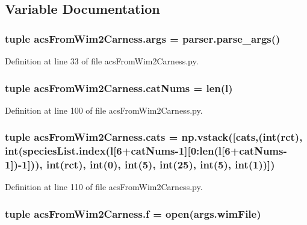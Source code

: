 \subsection{Variable Documentation}
\hypertarget{a00100_ac4c461267ee7f11bbe525de64f56cd10}{
\subsubsection[{args}]{\setlength{\rightskip}{0pt plus 5cm}tuple acs\-From\-Wim2\-Carness.\-args = parser.\-parse\-\_\-args()}}\label{a00100_ac4c461267ee7f11bbe525de64f56cd10}


Definition at line 33 of file acs\-From\-Wim2\-Carness.\-py.

\hypertarget{a00100_a0d474343423a1a87a760dd91411f96b4}{
\subsubsection[{cat\-Nums}]{\setlength{\rightskip}{0pt plus 5cm}tuple acs\-From\-Wim2\-Carness.\-cat\-Nums = len({\bf l})}}\label{a00100_a0d474343423a1a87a760dd91411f96b4}


Definition at line 100 of file acs\-From\-Wim2\-Carness.\-py.

\hypertarget{a00100_aea4d714ca7ceaba151380b3aed7c34d8}{
\subsubsection[{cats}]{\setlength{\rightskip}{0pt plus 5cm}tuple acs\-From\-Wim2\-Carness.\-cats = np.\-vstack(\mbox{[}cats,(int({\bf rct}), int({\bf species\-List.\-index}({\bf l}\mbox{[}6+{\bf cat\-Nums}-\/1\mbox{]}\mbox{[}0\-:len({\bf l}\mbox{[}6+{\bf cat\-Nums}-\/1\mbox{]})-\/1\mbox{]})), int({\bf rct}), int(0), int(5), int(25), int(5), int(1))\mbox{]})}}\label{a00100_aea4d714ca7ceaba151380b3aed7c34d8}


Definition at line 110 of file acs\-From\-Wim2\-Carness.\-py.

\hypertarget{a00100_ab599c65fad60b9c6ccc220002ce8f89c}{
\subsubsection[{f}]{\setlength{\rightskip}{0pt plus 5cm}tuple acs\-From\-Wim2\-Carness.\-f = open(args.\-wim\-File)}}\label{a00100_ab599c65fad60b9c6ccc220002ce8f89c}


